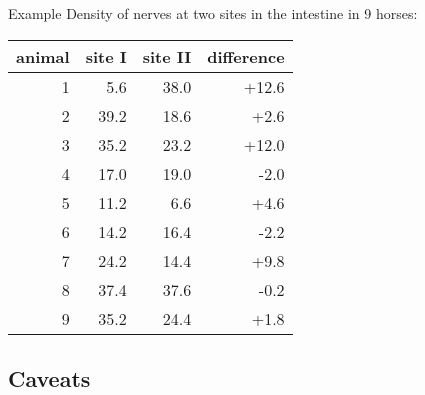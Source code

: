 \begin{frame}{Example}
    Density of nerves at two sites in the intestine in 9 horses:
    \begin{center}
\begin{tabular}{rrrr}
  \hline
 animal & site I & site II & difference \\ 
  \hline
  1 &  5.6 & 38.0 & +12.6 \\ 
  2 &  39.2 & 18.6 & +2.6 \\ 
  3 &  35.2 & 23.2 & +12.0 \\ 
  4 &  17.0 & 19.0 & -2.0 \\ 
  5 &  11.2 & 6.6 & +4.6 \\ 
  6 &  14.2 & 16.4 & -2.2 \\ 
  7 &  24.2 & 14.4 & +9.8 \\ 
  8 &  37.4 & 37.6 & -0.2 \\ 
  9 &  35.2 & 24.4 & +1.8 \\ 
   \hline
\end{tabular}
    \end{center}

\end{frame}

\subsection{Caveats}


